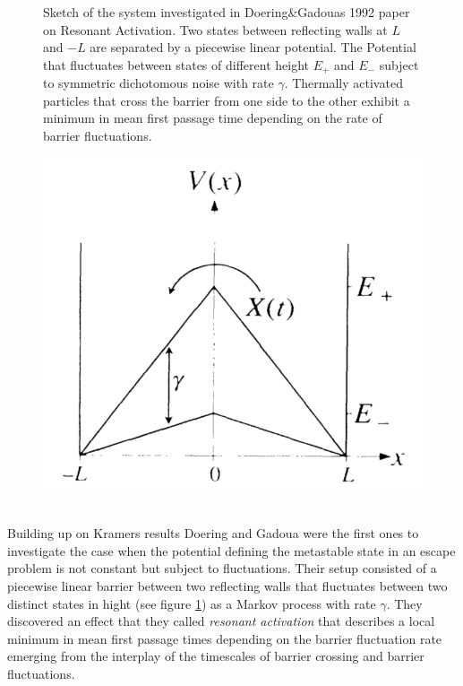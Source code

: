 \begin{minipage}[t]{0.62 \textwidth}
    \begin{figure}[H]
        \caption{Sketch of the system investigated in Doering\&Gadouas 1992 paper \cite{Doering1992} on Resonant Activation.  Two states between reflecting walls at $L$ and $-L$ are separated by a piecewise linear potential. The Potential that fluctuates between states of different height $E_+$ and $E_-$ subject to symmetric dichotomous noise with rate $\gamma$. Thermally activated particles that cross the barrier from one side to the other exhibit a minimum in mean first passage time depending on the rate of barrier fluctuations.\label{Gadoua}}
    \end{figure}
\end{minipage}\begin{minipage}[t]{0.38 \textwidth}
    \begin{figure}[H]
         \includegraphics[width = 1 \textwidth]{plots/Gadoua.png}
    \end{figure}
\end{minipage}
\vspace{.3 cm}\\
Building up on Kramers results Doering and Gadoua \cite{Doering1992} were the first ones to investigate the case when the potential defining the metastable state in an escape problem is not constant but subject to fluctuations. Their setup consisted of a piecewise linear barrier between two reflecting walls that fluctuates between two distinct states in hight (see figure \ref{Gadoua}) as a Markov process with rate $\gamma$. They discovered an effect that they called \emph{resonant activation} that describes a local minimum in mean first passage times depending on the barrier fluctuation rate emerging from the interplay of the timescales of barrier crossing and barrier fluctuations. \\
